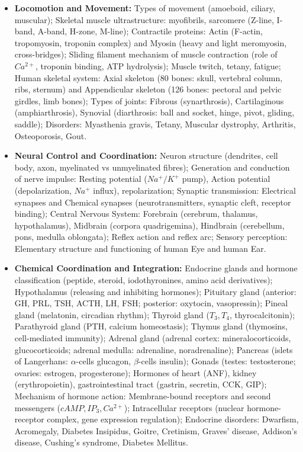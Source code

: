 \documentclass[11pt,a4paper]{article}
\begin{document}
\begin{itemize}
  \item \textbf{Locomotion and Movement:} Types of movement (amoeboid, ciliary, muscular); Skeletal muscle ultrastructure: myofibrils, sarcomere (Z-line, I-band, A-band, H-zone, M-line); Contractile proteins: Actin (F-actin, tropomyosin, troponin complex) and Myosin (heavy and light meromyosin, cross-bridges); Sliding filament mechanism of muscle contraction (role of $Ca^{2+}$, troponin binding, ATP hydrolysis); Muscle twitch, tetany, fatigue; Human skeletal system: Axial skeleton (80 bones: skull, vertebral column, ribs, sternum) and Appendicular skeleton (126 bones: pectoral and pelvic girdles, limb bones); Types of joints: Fibrous (synarthrosis), Cartilaginous (amphiarthrosis), Synovial (diarthrosis: ball and socket, hinge, pivot, gliding, saddle); Disorders: Myasthenia gravis, Tetany, Muscular dystrophy, Arthritis, Osteoporosis, Gout.
  \item \textbf{Neural Control and Coordination:} Neuron structure (dendrites, cell body, axon, myelinated vs unmyelinated fibres); Generation and conduction of nerve impulse: Resting potential ($Na^+/K^+$ pump), Action potential (depolarization, $Na^+$ influx), repolarization; Synaptic transmission: Electrical synapses and Chemical synapses (neurotransmitters, synaptic cleft, receptor binding); Central Nervous System: Forebrain (cerebrum, thalamus, hypothalamus), Midbrain (corpora quadrigemina), Hindbrain (cerebellum, pons, medulla oblongata); Reflex action and reflex arc; Sensory perception: Elementary structure and functioning of human Eye and human Ear.
  \item \textbf{Chemical Coordination and Integration:} Endocrine glands and hormone classification (peptide, steroid, iodothyronines, amino acid derivatives); Hypothalamus (releasing and inhibiting hormones); Pituitary gland (anterior: GH, PRL, TSH, ACTH, LH, FSH; posterior: oxytocin, vasopressin); Pineal gland (melatonin, circadian rhythm); Thyroid gland ($T_3, T_4$, thyrocalcitonin); Parathyroid gland (PTH, calcium homeostasis); Thymus gland (thymosins, cell-mediated immunity); Adrenal gland (adrenal cortex: mineralocorticoids, glucocorticoids; adrenal medulla: adrenaline, noradrenaline); Pancreas (islets of Langerhans: $\alpha$-cells glucagon, $\beta$-cells insulin); Gonads (testes: testosterone; ovaries: estrogen, progesterone); Hormones of heart (ANF), kidney (erythropoietin), gastrointestinal tract (gastrin, secretin, CCK, GIP); Mechanism of hormone action: Membrane-bound receptors and second messengers ($cAMP, IP_3, Ca^{2+}$); Intracellular receptors (nuclear hormone-receptor complex, gene expression regulation); Endocrine disorders: Dwarfism, Acromegaly, Diabetes Insipidus, Goitre, Cretinism, Graves' disease, Addison's disease, Cushing's syndrome, Diabetes Mellitus.
\end{itemize}
\end{document}
